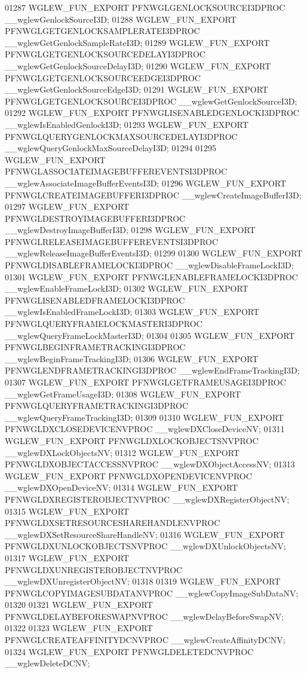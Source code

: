 \begin{DoxyCode}
01287 WGLEW_FUN_EXPORT PFNWGLGENLOCKSOURCEI3DPROC __wglewGenlockSourceI3D;
01288 WGLEW_FUN_EXPORT PFNWGLGETGENLOCKSAMPLERATEI3DPROC 
      __wglewGetGenlockSampleRateI3D;
01289 WGLEW_FUN_EXPORT PFNWGLGETGENLOCKSOURCEDELAYI3DPROC 
      __wglewGetGenlockSourceDelayI3D;
01290 WGLEW_FUN_EXPORT PFNWGLGETGENLOCKSOURCEEDGEI3DPROC 
      __wglewGetGenlockSourceEdgeI3D;
01291 WGLEW_FUN_EXPORT PFNWGLGETGENLOCKSOURCEI3DPROC __wglewGetGenlockSourceI3D;
01292 WGLEW_FUN_EXPORT PFNWGLISENABLEDGENLOCKI3DPROC __wglewIsEnabledGenlockI3D;
01293 WGLEW_FUN_EXPORT PFNWGLQUERYGENLOCKMAXSOURCEDELAYI3DPROC 
      __wglewQueryGenlockMaxSourceDelayI3D;
01294 
01295 WGLEW_FUN_EXPORT PFNWGLASSOCIATEIMAGEBUFFEREVENTSI3DPROC 
      __wglewAssociateImageBufferEventsI3D;
01296 WGLEW_FUN_EXPORT PFNWGLCREATEIMAGEBUFFERI3DPROC __wglewCreateImageBufferI3D;
01297 WGLEW_FUN_EXPORT PFNWGLDESTROYIMAGEBUFFERI3DPROC __wglewDestroyImageBufferI3D;
01298 WGLEW_FUN_EXPORT PFNWGLRELEASEIMAGEBUFFEREVENTSI3DPROC 
      __wglewReleaseImageBufferEventsI3D;
01299 
01300 WGLEW_FUN_EXPORT PFNWGLDISABLEFRAMELOCKI3DPROC __wglewDisableFrameLockI3D;
01301 WGLEW_FUN_EXPORT PFNWGLENABLEFRAMELOCKI3DPROC __wglewEnableFrameLockI3D;
01302 WGLEW_FUN_EXPORT PFNWGLISENABLEDFRAMELOCKI3DPROC __wglewIsEnabledFrameLockI3D;
01303 WGLEW_FUN_EXPORT PFNWGLQUERYFRAMELOCKMASTERI3DPROC 
      __wglewQueryFrameLockMasterI3D;
01304 
01305 WGLEW_FUN_EXPORT PFNWGLBEGINFRAMETRACKINGI3DPROC __wglewBeginFrameTrackingI3D;
01306 WGLEW_FUN_EXPORT PFNWGLENDFRAMETRACKINGI3DPROC __wglewEndFrameTrackingI3D;
01307 WGLEW_FUN_EXPORT PFNWGLGETFRAMEUSAGEI3DPROC __wglewGetFrameUsageI3D;
01308 WGLEW_FUN_EXPORT PFNWGLQUERYFRAMETRACKINGI3DPROC __wglewQueryFrameTrackingI3D;
01309 
01310 WGLEW_FUN_EXPORT PFNWGLDXCLOSEDEVICENVPROC __wglewDXCloseDeviceNV;
01311 WGLEW_FUN_EXPORT PFNWGLDXLOCKOBJECTSNVPROC __wglewDXLockObjectsNV;
01312 WGLEW_FUN_EXPORT PFNWGLDXOBJECTACCESSNVPROC __wglewDXObjectAccessNV;
01313 WGLEW_FUN_EXPORT PFNWGLDXOPENDEVICENVPROC __wglewDXOpenDeviceNV;
01314 WGLEW_FUN_EXPORT PFNWGLDXREGISTEROBJECTNVPROC __wglewDXRegisterObjectNV;
01315 WGLEW_FUN_EXPORT PFNWGLDXSETRESOURCESHAREHANDLENVPROC 
      __wglewDXSetResourceShareHandleNV;
01316 WGLEW_FUN_EXPORT PFNWGLDXUNLOCKOBJECTSNVPROC __wglewDXUnlockObjectsNV;
01317 WGLEW_FUN_EXPORT PFNWGLDXUNREGISTEROBJECTNVPROC __wglewDXUnregisterObjectNV;
01318 
01319 WGLEW_FUN_EXPORT PFNWGLCOPYIMAGESUBDATANVPROC __wglewCopyImageSubDataNV;
01320 
01321 WGLEW_FUN_EXPORT PFNWGLDELAYBEFORESWAPNVPROC __wglewDelayBeforeSwapNV;
01322 
01323 WGLEW_FUN_EXPORT PFNWGLCREATEAFFINITYDCNVPROC __wglewCreateAffinityDCNV;
01324 WGLEW_FUN_EXPORT PFNWGLDELETEDCNVPROC __wglewDeleteDCNV;

\end{DoxyCode}

